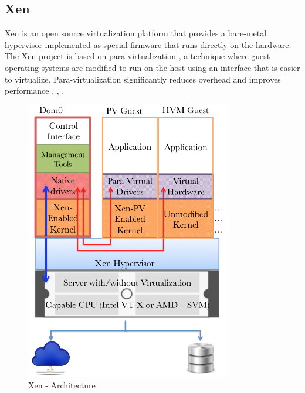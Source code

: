 
\subsection{Xen}


Xen \cite{xen_overview} is an open source virtualization platform that provides a bare-metal hypervisor implemented as special firmware that runs directly on the hardware. The Xen project is based on para-virtualization \cite{paravirt}  \cite{paravirt1}, a technique where guest operating systems are modified to run on the host using an interface that is easier to virtualize. Para-virtualization significantly reduces overhead and improves performance \cite{paravirt}, \cite{art_of_virt}, \cite{xen_perf}.

\begin{figure}[H]
\centering
\includegraphics[width=90mm]{xen-arch.png}
\caption{Xen - Architecture}
\label{xen_arch}
\end{figure}

